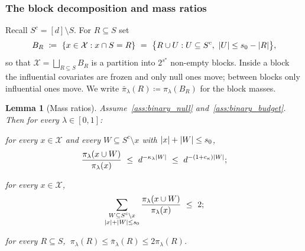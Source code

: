 \documentclass[aos]{imsart}%
\DeclarePairedDelimiter{\abs}{\lvert}{\rvert}
\newcommand{\ambientspace}[0]{\mathcal{X}}
\theoremstyle{plain}
\newtheorem{lemma}[theorem]{Lemma}
\theoremstyle{definition}
\begin{document}
    \subsubsection{The block decomposition and mass ratios}

    Recall $S^{c}=[d]\setminus S$. For $R\subseteq S$ set
    \begin{equation}
        \label{eq:binary_blocks}
        B_R\ \coloneq\ \{x\in\ambientspace:x\cap S=R\}
        \ =\ \bigl\{R\cup U:U\subseteq S^{c},\ \abs U\leq s_0-\abs R\bigr\},
    \end{equation}
    so that $\ambientspace=\bigsqcup_{R\subseteq S}B_R$ is a partition into
    $2^{s^{\star}}$ non-empty blocks. Inside a block the influential covariates
    are frozen and only null ones move; between blocks only influential ones
    move. We write $\bar\pi_\lambda(R)\coloneq\pi_\lambda(B_R)$ for the block
    masses.

    \begin{lemma}[Mass ratios]
        \label{lemma:binary_block_mass}
        Assume~\ref{ass:binary_null} and~\ref{ass:binary_budget}. Then for
        every $\lambda\in[0,1]$:
        \begin{equivcond}
            \item\label{it:binary_mass_i}
            for every $x\in\ambientspace$ and every $W\subseteq
            S^{c}\setminus x$ with $\abs x+\abs W\leq s_0$,
            \begin{equation}
                \label{eq:binary_Uratio}
                \frac{\pi_\lambda(x\cup W)}{\pi_\lambda(x)}
                \ \leq\ d^{-\kappa_\lambda\abs W}
                \ \leq\ d^{-(1+c_\kappa)\abs W} ;
            \end{equation}
            \item\label{it:binary_mass_ii}
            for every $x\in\ambientspace$,
            \begin{equation}
                \label{eq:binary_Usum}
                \sum_{\substack{W\subseteq S^{c}\setminus x\\
                \abs x+\abs W\leq s_0}}
                \frac{\pi_\lambda(x\cup W)}{\pi_\lambda(x)}\ \leq\ 2 ;
            \end{equation}
            \item\label{it:binary_mass_iii}
            for every $R\subseteq S$,
            $\ \pi_\lambda(R)\leq\bar\pi_\lambda(R)\leq2\pi_\lambda(R)$.
        \end{equivcond}
    \end{lemma}
\end{document}
